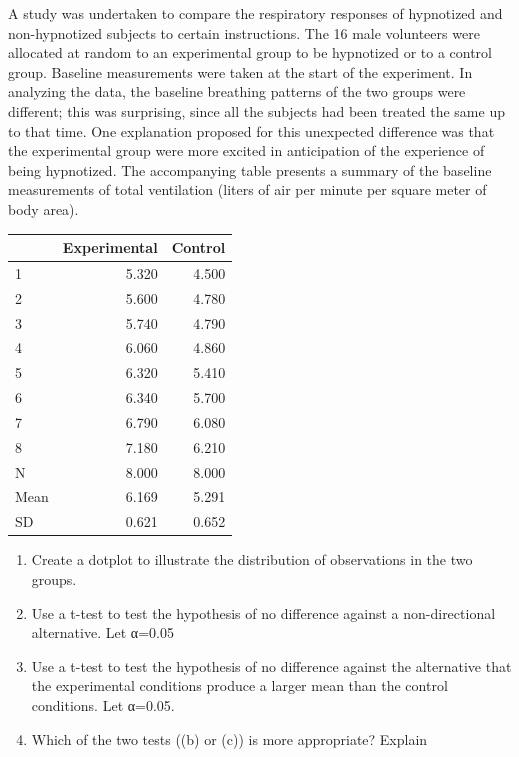 \documentclass[
]{book}
\providecommand{\tightlist}{%
  \setlength{\itemsep}{0pt}\setlength{\parskip}{0pt}}
\begin{document}
A study was undertaken to compare the respiratory responses of hypnotized and non-hypnotized subjects to certain instructions. The 16 male volunteers were allocated at random to an experimental group to be hypnotized or to a control group. Baseline measurements were taken at the start of the experiment. In analyzing the data, the baseline breathing patterns of the two groups were different; this was surprising, since all the subjects had been treated the same up to that time. One explanation proposed for this unexpected difference was that the experimental group were more excited in anticipation of the experience of being hypnotized. The accompanying table presents a summary of the baseline measurements of total ventilation (liters of air per minute per square meter of body area).

\begin{tabular}{l|r|r}
\hline
  & Experimental & Control\\
\hline
1 & 5.320 & 4.500\\
\hline
2 & 5.600 & 4.780\\
\hline
3 & 5.740 & 4.790\\
\hline
4 & 6.060 & 4.860\\
\hline
5 & 6.320 & 5.410\\
\hline
6 & 6.340 & 5.700\\
\hline
7 & 6.790 & 6.080\\
\hline
8 & 7.180 & 6.210\\
\hline
N & 8.000 & 8.000\\
\hline
Mean & 6.169 & 5.291\\
\hline
SD & 0.621 & 0.652\\
\hline
\end{tabular}

\begin{enumerate}
\def\labelenumi{\alph{enumi})}
\tightlist
\item
  Create a dotplot to illustrate the distribution of observations in the two groups.\\
\item
  Use a t-test to test the hypothesis of no difference against a non-directional alternative. Let α=0.05\\
\item
  Use a t-test to test the hypothesis of no difference against the alternative that the experimental conditions produce a larger mean than the control conditions. Let α=0.05.\\
\item
  Which of the two tests ((b) or (c)) is more appropriate? Explain
\end{enumerate}
\end{document}
